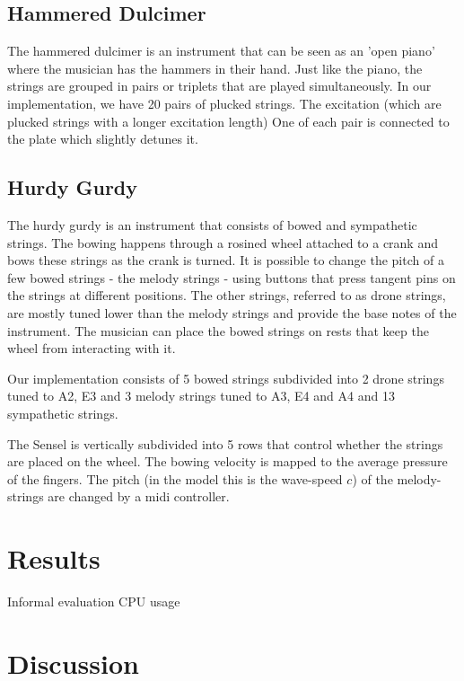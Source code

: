 \documentclass{article}
\begin{document}
\subsection{Hammered Dulcimer}
The hammered dulcimer is an instrument that can be seen as an 'open piano' where the musician has the hammers in their hand. Just like the piano, the strings are grouped in pairs or triplets
that are played simultaneously. 
In our implementation, we have 20 pairs of plucked strings. The excitation (which are plucked strings with a longer excitation length) %
One of each pair is connected to the plate which slightly detunes it.


\subsection{Hurdy Gurdy}
The hurdy gurdy is an instrument that consists of bowed and sympathetic strings. The bowing happens through a rosined wheel attached to a crank and bows these strings as the crank is turned. It is possible to change the pitch of a few bowed strings - the melody strings - using buttons that press tangent pins on the strings at different positions. The other strings, referred to as drone strings, are mostly tuned lower than the melody strings and provide the base notes of the instrument. The musician can place the bowed strings on rests that keep the wheel from interacting with it. 

Our implementation consists of 5 bowed strings subdivided into 2 drone strings tuned to A2, E3 and 3 melody strings tuned to A3, E4 and A4 and 13 sympathetic strings. 

The Sensel is vertically subdivided into 5 rows that control whether the strings are placed on the wheel. The bowing velocity is mapped to the average pressure of the fingers. The pitch (in the model this is the wave-speed $c$) of the melody-strings are changed by a midi controller.

\section{Results}
Informal evaluation
CPU usage

\section{Discussion}\label{sec:discussion}
\end{document}
